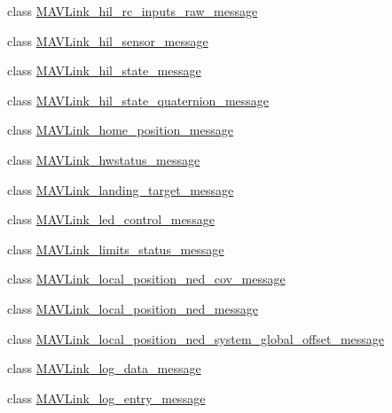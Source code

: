 \begin{DoxyCompactItemize}
class \hyperlink{classpymavlink_1_1dialects_1_1v10_1_1MAVLink__hil__rc__inputs__raw__message}{M\+A\+V\+Link\+\_\+hil\+\_\+rc\+\_\+inputs\+\_\+raw\+\_\+message}
\item 
class \hyperlink{classpymavlink_1_1dialects_1_1v10_1_1MAVLink__hil__sensor__message}{M\+A\+V\+Link\+\_\+hil\+\_\+sensor\+\_\+message}
\item 
class \hyperlink{classpymavlink_1_1dialects_1_1v10_1_1MAVLink__hil__state__message}{M\+A\+V\+Link\+\_\+hil\+\_\+state\+\_\+message}
\item 
class \hyperlink{classpymavlink_1_1dialects_1_1v10_1_1MAVLink__hil__state__quaternion__message}{M\+A\+V\+Link\+\_\+hil\+\_\+state\+\_\+quaternion\+\_\+message}
\item 
class \hyperlink{classpymavlink_1_1dialects_1_1v10_1_1MAVLink__home__position__message}{M\+A\+V\+Link\+\_\+home\+\_\+position\+\_\+message}
\item 
class \hyperlink{classpymavlink_1_1dialects_1_1v10_1_1MAVLink__hwstatus__message}{M\+A\+V\+Link\+\_\+hwstatus\+\_\+message}
\item 
class \hyperlink{classpymavlink_1_1dialects_1_1v10_1_1MAVLink__landing__target__message}{M\+A\+V\+Link\+\_\+landing\+\_\+target\+\_\+message}
\item 
class \hyperlink{classpymavlink_1_1dialects_1_1v10_1_1MAVLink__led__control__message}{M\+A\+V\+Link\+\_\+led\+\_\+control\+\_\+message}
\item 
class \hyperlink{classpymavlink_1_1dialects_1_1v10_1_1MAVLink__limits__status__message}{M\+A\+V\+Link\+\_\+limits\+\_\+status\+\_\+message}
\item 
class \hyperlink{classpymavlink_1_1dialects_1_1v10_1_1MAVLink__local__position__ned__cov__message}{M\+A\+V\+Link\+\_\+local\+\_\+position\+\_\+ned\+\_\+cov\+\_\+message}
\item 
class \hyperlink{classpymavlink_1_1dialects_1_1v10_1_1MAVLink__local__position__ned__message}{M\+A\+V\+Link\+\_\+local\+\_\+position\+\_\+ned\+\_\+message}
\item 
class \hyperlink{classpymavlink_1_1dialects_1_1v10_1_1MAVLink__local__position__ned__system__global__offset__message}{M\+A\+V\+Link\+\_\+local\+\_\+position\+\_\+ned\+\_\+system\+\_\+global\+\_\+offset\+\_\+message}
\item 
class \hyperlink{classpymavlink_1_1dialects_1_1v10_1_1MAVLink__log__data__message}{M\+A\+V\+Link\+\_\+log\+\_\+data\+\_\+message}
\item 
class \hyperlink{classpymavlink_1_1dialects_1_1v10_1_1MAVLink__log__entry__message}{M\+A\+V\+Link\+\_\+log\+\_\+entry\+\_\+message}

\end{DoxyCompactItemize}
